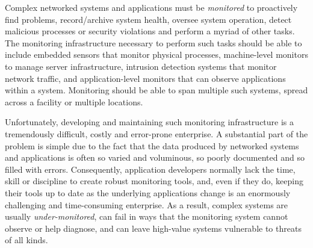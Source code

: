 

Complex networked systems and applications must be {\em monitored} to
proactively find problems, record/archive system health, oversee
system operation, detect malicious processes or security violations
and perform a myriad of other tasks.  
The monitoring infrastructure necessary to perform such tasks should
be able to include embedded sensors that monitor physical processes,
machine-level monitors to manage server infrastructure, intrusion
detection systems that monitor network traffic, and application-level
monitors that can observe applications within a system. Monitoring
should be able to span multiple such systems, spread across a facility
or multiple locations.

Unfortunately, developing and maintaining such monitoring
infrastructure is a tremendously difficult, costly and error-prone
enterprise. A substantial part of the problem is simple due to the
fact that the data produced by networked systems and applications is
often so varied and voluminous, so poorly documented and so filled
with errors.  Consequently, application developers normally lack the time,
skill or discipline to create robust monitoring tools, and, even if they do,
keeping their tools up to date as the underlying applications change
is an enormously challenging and time-consuming enterprise.  As a
result, complex systems are usually {\em under-monitored}, can
fail in ways that the monitoring system cannot observe or help
diagnose, and can leave high-value systems vulnerable to threats
of all kinds.


